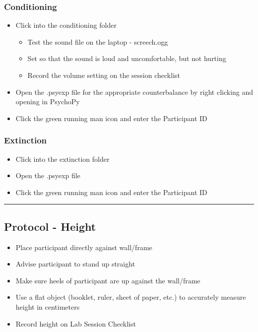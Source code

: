 \documentclass[]{book}
\providecommand{\tightlist}{%
  \setlength{\itemsep}{0pt}\setlength{\parskip}{0pt}}
\begin{document}
\hypertarget{conditioning}{%
\subsubsection{Conditioning}\label{conditioning}}

\begin{itemize}
\tightlist
\item
  Click into the conditioning folder

  \begin{itemize}
  \tightlist
  \item
    Test the sound file on the laptop - screech.ogg
  \item
    Set so that the sound is loud and uncomfortable, but not hurting
  \item
    Record the volume setting on the session checklist
  \end{itemize}
\item
  Open the .psyexp file for the appropriate counterbalance by right clicking and opening in PsychoPy
\item
  Click the green running man icon and enter the Participant ID
\end{itemize}

\hypertarget{extinction}{%
\subsubsection{Extinction}\label{extinction}}

\begin{itemize}
\tightlist
\item
  Click into the extinction folder
\item
  Open the .psyexp file
\item
  Click the green running man icon and enter the Participant ID
\end{itemize}

\begin{center}\rule{0.5\linewidth}{0.5pt}\end{center}

\hypertarget{protocol---height}{%
\subsection{Protocol - Height}\label{protocol---height}}

\begin{itemize}
\tightlist
\item
  Place participant directly against wall/frame
\item
  Advise participant to stand up straight
\item
  Make sure heels of participant are up against the wall/frame
\item
  Use a flat object (booklet, ruler, sheet of paper, etc.) to accurately measure height in centimeters
\item
  Record height on Lab Session Checklist
\end{itemize}
\end{document}
